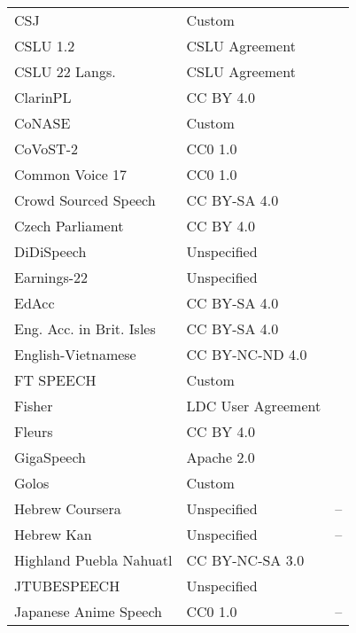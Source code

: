 \begin{longtable}{p{5cm}|p{5cm}|p{5cm}}
CSJ & Custom & \autocite{maekawaCorpusSpontaneousJapanese2003} \\
CSLU 1.2 & CSLU Agreement & \autocite{landertCSLUForeignAccented2007} \\
CSLU 22 Langs. & CSLU Agreement & \autocite{landertCSLU22Languages2005} \\
ClarinPL & CC BY 4.0 & \autocite{korzinekPolishReadSpeech2017} \\
CoNASE & Custom & \autocite{coatsCorpusRegionalAmerican2019} \\
CoVoST-2 & CC0 1.0 & \autocite{wangCoVoSTMassivelyMultilingual2020} \\
Common Voice 17 & CC0 1.0 & \autocite{ardilaCommonVoiceMassivelyMultilingual2020} \\
Crowd Sourced Speech & CC BY-SA 4.0 & \autocite{kjartanssonCrowdSourcedSpeechCorpora2018} \\
Czech Parliament & CC BY 4.0 & \autocite{kratochvilLargeCorpusCzech2020} \\
DiDiSpeech & Unspecified & \autocite{guoDiDiSpeechLargeScale2021} \\
Earnings-22 & Unspecified & \autocite{delrioEarnings22PracticalBenchmark2022} \\
EdAcc & CC BY-SA 4.0 & \autocite{sanabriaEdinburghInternationalAccents2023} \\
Eng. Acc. in Brit. Isles & CC BY-SA 4.0 & \autocite{demirsahinOpensourceMultispeakerCorpora2020} \\
English-Vietnamese & CC BY-NC-ND 4.0 & \autocite{nguyenHighQualityLargeScaleDataset2022} \\
FT SPEECH & Custom & \autocite{kirkedalFTSpeechDanish2020} \\
Fisher & LDC User Agreement & \autocite{cieriFisherCorpusResource2004} \\
Fleurs & CC BY 4.0 & \autocite{conneauFLEURSFewshotLearning2022} \\
GigaSpeech & Apache 2.0 & \autocite{chenGigaSpeechEvolvingMultidomain2021} \\
Golos & Custom & \autocite{karpovGolosRussianDataset2021} \\
Hebrew Coursera & Unspecified & -- \\
Hebrew Kan & Unspecified & -- \\
Highland Puebla Nahuatl & CC BY-NC-SA 3.0 & \autocite{shiHighlandPueblaNahuatl2021} \\
JTUBESPEECH & Unspecified & \autocite{takamichiJTubeSpeechCorpusJapanese2021} \\
Japanese Anime Speech & CC0 1.0 & -- \\

\end{longtable}
